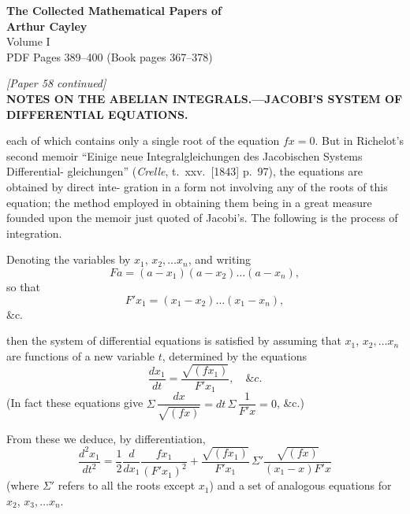 \documentclass[11pt]{article}
\begin{document}
\begin{center}
{\LARGE\bfseries The Collected Mathematical Papers of}\\[0.5em]
{\LARGE\bfseries Arthur Cayley}\\[1em]
{\Large Volume I}\\[1em]
{\large PDF Pages 389--400 \quad (Book pages 367--378)}\\[2em]
\end{center}

\bigskip

\begin{center}
\textit{[Paper 58 continued]}\\[0.5em]
\textbf{\large NOTES ON THE ABELIAN INTEGRALS.---JACOBI'S SYSTEM OF}\\[0.3em]
\textbf{\large DIFFERENTIAL EQUATIONS.}
\end{center}

\medskip

\noindent each of which contains only a single root of the equation $f x = 0$. But in Richelot's
second memoir ``Einige neue Integralgleichungen des Jacobischen Systems Differential-
gleichungen'' (\textit{Crelle}, t.~xxv.\ [1843] p.~97), the equations are obtained by direct inte-
gration in a form not involving any of the roots of this equation; the method employed
in obtaining them being in a great measure founded upon the memoir just quoted
of Jacobi's. The following is the process of integration.

\medskip
Denoting the variables by $x_{1}$, $x_{2},\ldots x_{n}$, and writing
\[
F a = (a - x_{1})(a - x_{2})\ldots(a - x_{n}),
\]
so that
\[
F'x_{1} = (x_{1} - x_{2})\ldots(x_{1} - x_{n}),
\]
\&c.

\medskip
then the system of differential equations is satisfied by assuming that $x_{1}$, $x_{2},\ldots x_{n}$ are
functions of a new variable $t$, determined by the equations
\[
\frac{d x_{1}}{d t} = \frac{\sqrt{(f x_{1})}}{F'x_{1}},\quad \&c.
\]
(In fact these equations give
$\Sigma\,\dfrac{d x}{\sqrt{(f x)}} = dt\,\Sigma\,\dfrac{1}{F'x}=0$, \&c.)

\medskip
From these we deduce, by differentiation,
\[
\frac{d^{2}x_{1}}{d t^{2}}
= \frac{1}{2}\frac{d}{d x_{1}}\frac{f x_{1}}{(F'x_{1})^{2}}
+ \frac{\sqrt{(f x_{1})}}{F'x_{1}}\,
\Sigma'\frac{\sqrt{(f x)}}{(x_{1}-x)F'x}
\]
(where $\Sigma'$ refers to all the roots except $x_{1}$) and a set of analogous equations for
$x_{2}$, $x_{3},\ldots x_{n}$.
\end{document}
